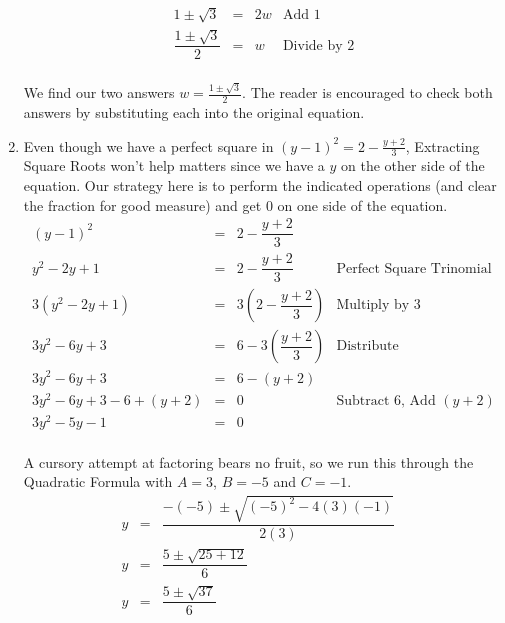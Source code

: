 \documentclass[10pt]{article}
\begin{document}
\begin{ex}
\begin{enumerate}
\[\begin{array}{rclr}
1 \pm \sqrt{3} & = & 2w & \text{Add $1$} \\

\dfrac{1 \pm \sqrt{3}}{2} & = & w & \text{Divide by $2$} \\

\end{array} \]

We find our two answers $w = \frac{1 \pm \sqrt{3}}{2}$.  The reader is encouraged to check both answers by substituting each into the original equation.

\item Even though we have a perfect square in $(y-1)^2 = 2 - \frac{y+2}{3}$, Extracting Square Roots won't help matters since we have a $y$ on the other side of the equation.  Our strategy here is to perform the indicated operations (and clear the fraction for good measure) and get $0$ on one side of the equation.\[ \begin{array}{rclr}

(y-1)^2 & = &  2 - \dfrac{y+2}{3} & \\ [8pt]

y^2 - 2y + 1 & = & 2 - \dfrac{y+2}{3} & \text{Perfect Square Trinomial}\\ [8pt]

3(y^2 - 2y + 1) & = & 3\left(2 - \dfrac{y+2}{3} \right) & \text{Multiply by $3$} \\ [10pt]
3y^2 - 6y + 3 & = & 6 - 3\left(\dfrac{y+2}{3}\right) & \text{Distribute} \\ [8pt]

3y^2 - 6y + 3 & = & 6 - (y+2) & \\

3y^2 - 6y + 3 - 6 + (y+2) & = & 0 & \text{Subtract $6$, Add $(y+2)$}\\

3y^2 - 5y - 1 & = & 0 & \\

\end{array}\]

A cursory attempt at factoring bears no fruit, so we run this through the Quadratic Formula with $A = 3$, $B = -5$ and $C = -1$. \[ \begin{array}{rclr}

y & = & \dfrac{-(-5) \pm \sqrt{(-5)^2 - 4(3)(-1)}}{2(3)} & \\ [8pt]

y & = & \dfrac{5 \pm \sqrt{25 + 12}}{6} & \\[8pt]

y & = & \dfrac{5 \pm \sqrt{37}}{6} & \\


\end{array}\]
\end{enumerate}
\end{ex}
\end{document}

